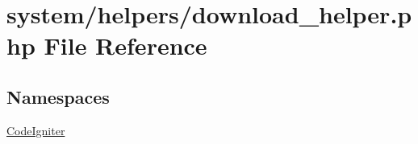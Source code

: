 \hypertarget{download__helper_8php}{\section{system/helpers/download\-\_\-helper.php File Reference}
\label{download__helper_8php}
}
\subsection*{Namespaces}
\begin{DoxyCompactItemize}
\item 
\hyperlink{namespace_code_igniter}{Code\-Igniter}
\end{DoxyCompactItemize}

